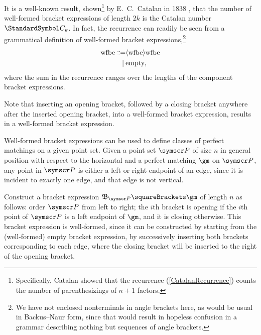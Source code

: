 \documentclass[10pt, a4paper, twoside]{basestyle}
\newcommand{\CatalanNumber}[1]{\StandardSymbol C_{#1}}
\newcommand{\pointset}{\symscr}
\begin{document}
It is a well-known result, shown\footnote{Specifically, Catalan showed that the recurrence (\ref{CatalanRecurrence})
counts the number of parenthesizings of $n+1$ factors.} by E.~C.~Catalan in 1838 \cite{Catalan1838}, that the
number of well-formed bracket expressions
of length $2k$ is the Catalan number $\CatalanNumber k$. In fact, the recurrence can readily be seen from
a grammatical definition of well-formed bracket expressions,\footnote{We have not enclosed nonterminals
in angle brackets here, as would be usual in Backus--Naur form, since that would result in hopeless
confusion in a grammar describing nothing but sequences of angle brackets.}\begin{align*}
\text{wfbe} \Coloneq
& \langle \text{wfbe} \rangle \text{wfbe} \\
\mid\: & \text{empty}\text,
\end{align*}
where the sum in the recurrence ranges over the lengths of the component bracket expressions.

Note that inserting an opening bracket, followed by a closing bracket anywhere after the
inserted opening bracket, into a well-formed bracket expression, results in a well-formed bracket
expression.

Well-formed bracket expressions can be used to define classes of perfect matchings on a given point set.
Given a point set $\pointset P$  of size $n$ in general position with respect to the horizontal and a perfect
matching $\gm$ on $\pointset P$, any point in $\pointset P$ is either a left or right endpoint of an edge, since it
is incident to exactly one edge, and that edge is not vertical.

Construct a bracket expression ${\mathfrak B}_{\pointset P}\of\gm$ of length $n$ as follows: order $\pointset P$ from left
to right;
the $i$th bracket is opening if the $i$th point of $\pointset P$ is a left endpoint of $\gm$, and it is
closing otherwise.
This bracket expression is well-formed, since it can be constructed by starting from the
(well-formed) empty bracket expression, by successively inserting both brackets corresponding to
each edge, where the closing bracket will be inserted to the right of the opening bracket.
\end{document}
